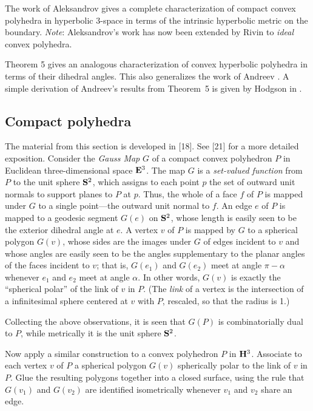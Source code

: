 The work of Aleksandrov \cite{Alek45a, Alek50} gives a
complete characterization of compact convex polyhedra 
in hyperbolic 3-space in terms of the intrinsic hyperbolic 
metric on the
boundary. 
{\em Note\/}:  Aleksandrov's work has now been extended by 
Rivin
\cite{R2} to {\it ideal} convex polyhedra.

Theorem 5 gives an analogous characterization of convex 
hyperbolic  
polyhedra in terms of their dihedral angles. This also 
generalizes the
work of Andreev \cite{Andr70a}. A simple derivation of 
Andreev's
results from Theorem~5 is given by Hodgson in \cite{HR2}.

\subsection{Compact polyhedra}

The material from this section is developed in [18]. See 
[21] for a more detailed
exposition. Consider the {\em Gauss
Map\/} $G$ of a compact convex polyhedron $P$ in Euclidean 
three-dimensional 
space $\bold{E}^3$. The map $G$ is a {\sl set-valued function} 
from $P$ to
the unit sphere $\bold{S}^2$, which assigns to each point $p$ 
the set of
outward unit normals to support planes to $P$ at $p$. 
Thus, the whole
of a face $f$ of $P$ is mapped under $G$ to a single 
point---the
outward unit normal to $f$. An edge $e$ of $P$ is mapped 
to a geodesic
segment $G(e)$ on $\bold{S}^2$, whose length is easily seen to 
be the exterior
dihedral angle at $e$. A vertex $v$ of $P$ is mapped by 
$G$ to a
spherical polygon $G(v)$, whose sides are the images under 
$G$ of edges
incident to $v$ and whose angles are easily seen to be the 
angles
supplementary to the planar angles of the faces incident 
to $v$; that
is, $G(e_1)$ and $G(e_2)$ meet at angle $\pi-\alpha$ 
whenever $e_1$
and $e_2$ meet at angle $\alpha$. In other words, $G(v)$ 
is exactly the
``spherical polar'' of the link of $v$ in $P$. (The {\em 
link\/} of a vertex is the
intersection of a infinitesimal sphere centered at $v$ 
with $P$, rescaled, so
that the radius is 1.)

Collecting the above observations, it is seen that $G(P)$ is
combinatorially dual to $P$, while metrically it is the
unit sphere $\bold{S}^2$.

Now apply a similar construction to a convex polyhedron 
$P$ in
$\bold{H}^3$. Associate to each vertex $v$ of $P$ a spherical 
polygon $G(v)$
spherically polar to the link of $v$ in $P$. Glue the 
resulting
polygons together into a closed surface, using the rule 
that $G(v_1)$
and $G(v_2)$ are identified isometrically whenever $v_1$ 
and $v_2$ share 
an edge.

